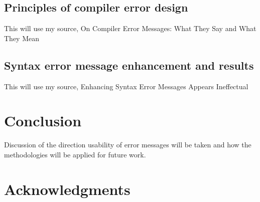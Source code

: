 \documentclass{sig-alternate}
\begin{document}
\subsection{Principles of compiler error design}
This will use my source, On Compiler Error Messages: What They Say and What They Mean

\subsection{Syntax error message enhancement and results}
This will use my source, Enhancing Syntax Error Messages Appears Ineffectual


\section{Conclusion}
Discussion of the direction usability of error messages will be taken and how the methodologies will be applied for future work.



\section{Acknowledgments}




  

~\cite{Denny:2014:ESE:2591708.2591748}
~\cite{Hartmann:2010:OPS:1753326.1753478}
~\cite{Isa:1983:MOE:800045.801583}
~\cite{Kummerfeld:2003:NBF:858403.858416}
~\cite{Marceau:2011:MEE:1953163.1953308}
~\cite{Marceau:2011:MYL:2048237.2048241}
~\cite{Murphy:2008:BTD:1352135.1352193}
~\cite{Traver:2010}
\end{document}
